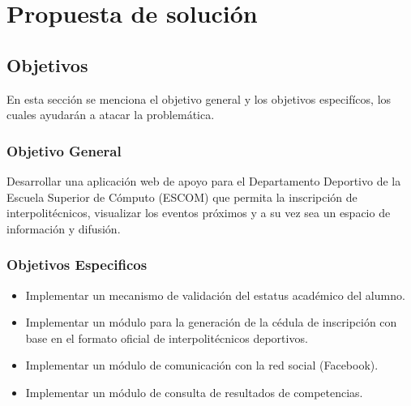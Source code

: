 \chapter{Propuesta de solución}

\section{Objetivos}
\noindent En esta sección se menciona el objetivo general y los objetivos especifícos, los cuales ayudarán a atacar la problemática.
\subsection{Objetivo General}
\noindent Desarrollar una aplicación web de apoyo para el Departamento Deportivo de la Escuela Superior de Cómputo (ESCOM) que permita la inscripción de interpolitécnicos, visualizar los eventos próximos y a su vez sea un espacio de información y difusión.
\subsection{Objetivos Especificos}
\begin{itemize}
	\item Implementar un mecanismo de validación del estatus académico del alumno. 
	\item Implementar un módulo para la generación de la cédula de inscripción con base en el formato oficial de interpolitécnicos deportivos. 
	\item Implementar un módulo de comunicación con la red social (Facebook). 
	\item Implementar un módulo de consulta de resultados de competencias.
\end{itemize}
\pagebreak

